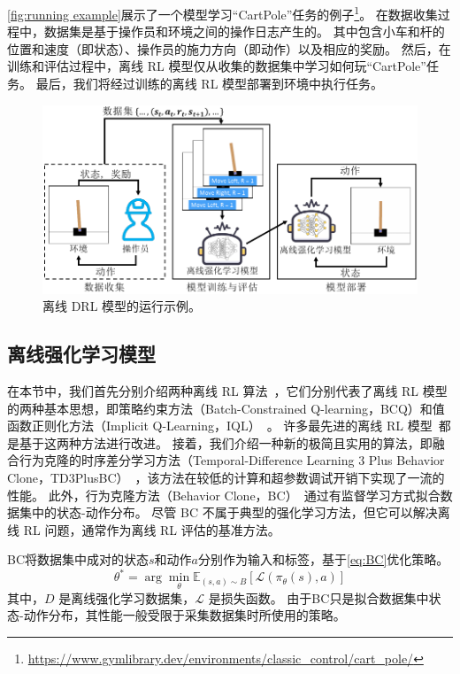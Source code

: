 \autoref{fig:running example}展示了一个模型学习“CartPole”任务的例子\footnote{\url{https://www.gymlibrary.dev/environments/classic_control/cart_pole/}}。
在数据收集过程中，数据集是基于操作员和环境之间的操作日志产生的。
其中包含小车和杆的位置和速度（即状态）、操作员的施力方向（即动作）以及相应的奖励。
然后，在训练和评估过程中，离线 RL 模型仅从收集的数据集中学习如何玩“CartPole”任务。
最后，我们将经过训练的离线 RL 模型部署到环境中执行任务。

\begin{figure}[!t]
    \centering
    \includegraphics[width=0.8\hsize]{figure/orl_auditor/offline-rlch.pdf}
    \caption{离线 DRL 模型的运行示例。}
    \label{fig:running example}
\end{figure}


\subsection{离线强化学习模型}
\label{sec:offline reinforcement learning model}
在本节中，我们首先分别介绍两种离线 RL 算法~\cite{DBLP:conf/icml/FujimotoMP19, DBLP:journals/corr/abs-1910-01708, DBLP:conf/iclr/KostrikovNL22}，它们分别代表了离线 RL 模型的两种基本思想，即策略约束方法（Batch-Constrained Q-learning，BCQ）和值函数正则化方法（Implicit Q-Learning，IQL）~\cite{DBLP:journals/corr/abs-2203-01387}。
许多最先进的离线 RL 模型~\cite{DBLP:conf/nips/YuKRRLF21, DBLP:conf/nips/KidambiRNJ20, DBLP:conf/nips/FujimotoG21, DBLP:conf/iclr/KostrikovNL22}都是基于这两种方法进行改进。
接着，我们介绍一种新的极简且实用的算法，即融合行为克隆的时序差分学习方法（Temporal-Difference Learning 3 Plus Behavior Clone，TD3PlusBC）~\cite{DBLP:conf/nips/FujimotoG21}，该方法在较低的计算和超参数调试开销下实现了一流的性能。
此外，行为克隆方法（Behavior Clone，BC）~\cite{DBLP:conf/nips/Pomerleau88}通过有监督学习方式拟合数据集中的状态-动作分布。
尽管 BC 不属于典型的强化学习方法，但它可以解决离线 RL 问题，通常作为离线 RL 评估的基准方法。

BC将数据集中成对的状态$s$和动作$a$分别作为输入和标签，基于\autoref{eq:BC}优化策略。
\begin{equation}
    \theta^*=\arg \min _\theta \mathbb{E}_{(s, a) \sim B}\left[\mathcal{L}\left(\pi_\theta(s), a\right)\right]
    \label{eq:BC}
\end{equation}
其中，$D$ 是离线强化学习数据集，$\mathcal{L}$ 是损失函数。
由于BC只是拟合数据集中状态-动作分布，其性能一般受限于采集数据集时所使用的策略。

